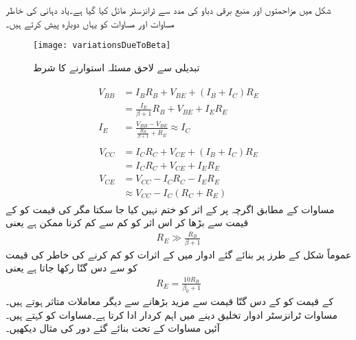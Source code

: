 شکل   میں مزاحمتوں اور منبع برقی دباو کی مدد سے ٹرانزسٹر مائل کیا گیا ہے۔یاد دہانی کی خاطر مساوات   اور مساوات   کو یہاں دوبارہ پیش کرتے ہیں۔
\begin{figure}
\centering
\texttt{[image: variationsDueToBeta]}
\caption{تبدیلی  سے لاحق مسئلہ استوارنے کا شرط}
\label{شکل_تبدیلی_سے_لاحق_مسئلہ_استوارنے_کا_شرط}
\end{figure}
%
\begin{gather} \label{مساوات_ٹرانزسٹر_دور_بمع_تینوں_مزاحمت_کی_داخلی_جانب_الف}
\begin{aligned}
V_{BB} &=I_B R_B +V_{BE}+\left (I_B+I_C \right )R_E\\
&=\frac{I_E}{\beta+1} R_B +V_{BE}+I_E R_E\\
I_E&=\frac{V_{BB}-V_{BE}}{\frac{R_B}{\beta+1}+R_E} \approx I_C
\end{aligned}
\end{gather}
%
\begin{gather} \label{مساوات_ٹرانزسٹر_دور_بمع_تینوں_مزاحمت_کی_خارجی_جانب_الف}
\begin{aligned}
V_{CC} &=I_C R_C +V_{CE}+\left (I_B+I_C \right ) R_E \\
&=I_C R_C +V_{CE} +I_E R_E\\
V_{CE} &=V_{CC}-I_C R_C - I_E R_E\\
&\approx V_{CC}-I_C \left (R_C+R_E \right )
\end{aligned}
\end{gather}
مساوات   کے مطابق اگرچہ  پر  کے اثر کو ختم نہیں کیا جا سکتا مگر   کی قیمت کو  کے قیمت سے بڑھا کر اس اثر کو کم سے کم کرنا ممکن ہے یعنی
\begin{align}\label{مساوات_ٹرانزسٹر_مخارج_قابو_مزاحمت_کی_شرط_الف}
R_E \gg \frac{R_B}{\beta+1}
\end{align}
عموماً شکل   کے طرز پر بنائے گئے ادوار میں  کے اثرات کو کم کرنے کی خاطر  کی قیمت کو   سے دس گنّا رکھا جاتا ہے یعنی
\begin{align} \label{مساوات_ٹرانزسٹر_مخارج_قابو_مزاحمت_کی_شرح}
R_E = \frac{10 R_B}{\beta_0+1}
\end{align}
 کے قیمت کو  کے دس گنّا قیمت سے مزید بڑھانے سے دیگر معاملات متاثر ہوتے ہیں۔مساوات   ٹرانزسٹر ادوار تخلیق دینے میں اہم کردار ادا کرتا ہے۔مساوات   کو  کہتے ہیں۔آئیں مساوات   کے تحت بنائے گئے دور کی مثال دیکھیں۔

